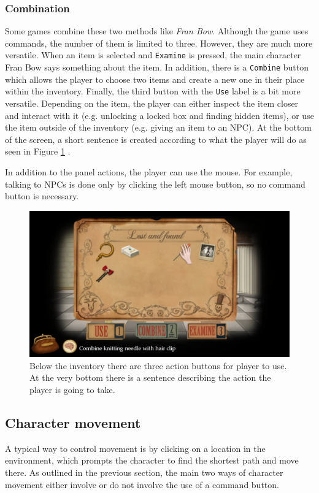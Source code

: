 \subsubsection{Combination}
Some games combine these two methods like \textit{Fran Bow}. Although the game uses commands, the number of them is limited to three. However, they are much more versatile. When an item is selected and \texttt{Examine} is pressed, the main character Fran Bow says something about the item. In addition, there is a \texttt{Combine} button which allows the player to choose two items and create a new one in their place within the inventory. Finally, the third button with the \texttt{Use} label is a bit more versatile. Depending on the item, the player can either inspect the item closer and interact with it (e.g. unlocking a locked box and finding hidden items), or use the item outside of the inventory (e.g. giving an item to an NPC). At the bottom of the screen, a short sentence is created according to what the player will do as seen in Figure \ref{fig:C-FranBow} . 

In addition to the panel actions, the player can use the mouse. For example, talking to NPCs is done only by clicking the left mouse button, so no command button is necessary. 
\begin{figure}[H]
\centering
\includegraphics[width=.8\linewidth]{img/Fran_Bow.png}
\caption{Below the inventory there are three action buttons for player to use. At the very bottom there is a sentence describing the action the player is going to take.}
\label{fig:C-FranBow}
\end{figure}

\subsection{Character movement}
\label{sec:Character movement}A typical way to control movement is by clicking on a location in the environment, which prompts the character to find the shortest path and move there.  As outlined in the previous section, the main two ways of character movement either involve or do not involve the use of a command button.

